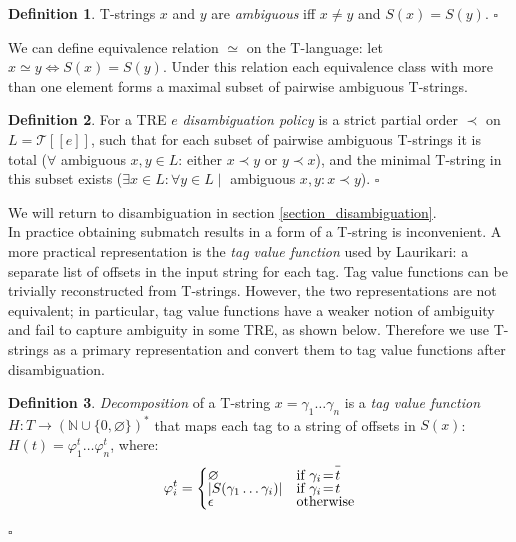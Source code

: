 \documentclass{article}
\newcommand{\Xin}{\!\in\!}
\newcommand{\Xeq}{\!=\!}
\newcommand{\Xlb}{[\![}
\newcommand{\Xrb}{]\!]}
\newcommand{\XT}{\mathcal{T}}
\newcommand{\YN}{\mathbb{N}}
\newcommand*{\Xbar}[1]{\overline{#1\vphantom{\bar{#1}}}}
\theoremstyle{definition}
\newtheorem{Xdef}{Definition}
\begin{document}
\begin{multicols}{2}
    \begin{Xdef}
    T-strings $x$ and $y$ are \emph{ambiguous} iff $x \!\neq\! y$ and $S(x) \Xeq S(y)$.
    $\square$
    \end{Xdef}

We can define equivalence relation $\simeq$ on the T-language: let $x \simeq y \Leftrightarrow S(x) \Xeq S(y)$.
Under this relation each equivalence class with more than one element forms a maximal subset of pairwise ambiguous T-strings.

    \begin{Xdef}
    For a TRE $e$ \emph{disambiguation policy} is a strict partial order $\prec$ on $L \Xeq \XT \Xlb e \Xrb$, such that
    for each subset of pairwise ambiguous T-strings
    it is total ($\forall$ ambiguous $x, y \Xin L$: either $x \prec y$ or $y \prec x$),
    and the minimal T-string in this subset exists ($\exists x \Xin L: \forall y \Xin L \mid$ ambiguous $x, y: x \prec y$).
    $\square$
    \end{Xdef}

We will return to disambiguation in section \ref{section_disambiguation}.
\\

In practice obtaining submatch results in a form of a T-string is inconvenient.
A more practical representation is the \emph{tag value function} used by Laurikari: 
a separate list of offsets in the input string for each tag.
Tag value functions can be trivially reconstructed from T-strings.
However, the two representations are not equivalent;
in particular, tag value functions have a weaker notion of ambiguity and fail to capture ambiguity in some TRE, as shown below.
Therefore we use T-strings as a primary representation
and convert them to tag value functions after disambiguation.

    \begin{Xdef}\label{tagvalfun}
    \emph{Decomposition} of a T-string $x \Xeq \gamma_1 \dots \gamma_n$
    is a \emph{tag value function} $H: T \rightarrow (\YN \cup \{ 0, \varnothing \})^*$
    that maps each tag to a string of offsets in $S(x)$:
    $H(t) \Xeq \varphi^t_1 \dots \varphi^t_n$, where:
    $$\varphi^t_i = \begin{cases}
            \varnothing &\text{if } \gamma_i \Xeq \Xbar{t} \\[-0.5em]
            |S(\gamma_1 \dots \gamma_i)| &\text{if } \gamma_i \Xeq t \\[-0.5em]
            \epsilon &\text{otherwise}
        \end{cases}$$
    $\square$
    \end{Xdef}


\end{multicols}
\end{document}
